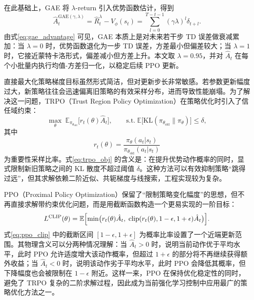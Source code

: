 \documentclass[12pt,a4paper]{ctexart}
\numberwithin{equation}{section}
\numberwithin{table}{section}
\numberwithin{figure}{section}
\newcommand{\subtopic}[1]{\par\addvspace{0.2\baselineskip}\ignorespaces}
\begin{document}
在此基础上，GAE 将 $\lambda$-return 引入优势函数估计，得到
\begin{equation}
\hat{A}_t^{\mathrm{GAE}(\gamma,\lambda)}=\hat{R}_t^{\lambda}-V_\phi(s_t)
=\sum_{l=0}^{T-t-1}(\gamma\lambda)^l\delta_{t+l}.
\label{eq:gae_advantage}
\end{equation}
由式\eqref{eq:gae_advantage} 可见，GAE 本质上是对未来若干步 TD 误差做衰减累加：当 $\lambda=0$ 时，优势函数退化为一步 TD 误差，方差最小但偏差较大；当 $\lambda=1$ 时，它接近蒙特卡洛形式，偏差减小但方差上升。本文取 $\lambda=0.95$，并对 $\hat{A}_t$ 在每个小批量内执行均值-方差归一化，以稳定后续 PPO 更新。

\subtopic{从 TRPO 到 PPO}
直接最大化策略梯度目标虽然形式简洁，但对更新步长非常敏感。若参数更新幅度过大，新策略往往会迅速偏离旧策略的有效采样分布，进而导致性能崩塌。为了解决这一问题，TRPO（Trust Region Policy Optimization）在策略优化时引入了信任域约束：
\begin{equation}
\max_\theta\;\mathbb{E}_{\pi_{\theta_{\text{old}}}}\bigl[r_t(\theta)\hat{A}_t\bigr],
\qquad
\text{s.t.}\;\mathbb{E}\bigl[\mathrm{KL}(\pi_{\theta_{\text{old}}}\|\pi_\theta)\bigr]\le\delta,
\label{eq:trpo_obj}
\end{equation}
其中
\begin{equation}
r_t(\theta)=\frac{\pi_\theta(a_t|s_t)}{\pi_{\theta_{\text{old}}}(a_t|s_t)}
\label{eq:importance_ratio}
\end{equation}
为重要性采样比率。式\eqref{eq:trpo_obj} 的含义是：在提升优势动作概率的同时，显式限制新旧策略之间的 KL 散度不超过阈值 $\delta$。这种方法可以有效抑制策略“跳得过远”，但其求解依赖二阶近似、共轭梯度与线搜索，工程实现较为复杂。

PPO（Proximal Policy Optimization）保留了“限制策略变化幅度”的思想，但不再直接求解带约束优化问题，而是用截断函数构造一个更易实现的一阶目标：
\begin{equation}
L^{\mathrm{CLIP}}(\theta)=\mathbb{E}\Bigl[\min\bigl(r_t(\theta)\hat{A}_t,\;\mathrm{clip}(r_t(\theta),1-\epsilon,1+\epsilon)\hat{A}_t\bigr)\Bigr].
\label{eq:ppo_clip}
\end{equation}
式\eqref{eq:ppo_clip} 中的截断区间 $[1-\epsilon,1+\epsilon]$ 为概率比率设置了一个近端更新范围。其物理含义可以分两种情况理解：当 $\hat{A}_t>0$ 时，说明当前动作优于平均水平，此时 PPO 允许适度增大该动作概率，但超过 $1+\epsilon$ 的部分将不再继续获得额外收益；当 $\hat{A}_t<0$ 时，说明该动作劣于平均水平，此时 PPO 会降低其概率，但下降幅度也会被限制在 $1-\epsilon$ 附近。这样一来，PPO 在保持优化稳定性的同时，避免了 TRPO 复杂的二阶求解过程，因此成为当前强化学习控制中应用最广的策略优化方法之一。
\end{document}
